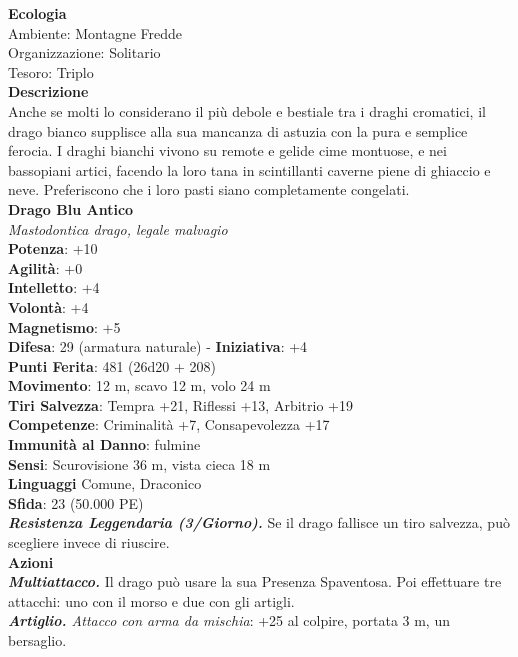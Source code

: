 \begin{multicols}{2}
\textbf{Ecologia}\\
Ambiente: Montagne Fredde\\
Organizzazione: Solitario\\
Tesoro: Triplo\\
\textbf{Descrizione}\\
Anche se molti lo considerano il più debole e bestiale tra i draghi cromatici, il drago bianco supplisce alla sua mancanza di astuzia con la pura e semplice ferocia. I draghi bianchi vivono su remote e gelide cime montuose, e nei bassopiani artici, facendo la loro tana in scintillanti caverne piene di ghiaccio e neve. Preferiscono che i loro pasti siano completamente congelati.\\


\medskip\textbf{Drago Blu Antico}\\
\emph{Mastodontica drago, legale malvagio}\\
\textbf{Potenza}: +10\\
\textbf{Agilità}: +0\\
\textbf{Intelletto}: +4\\
\textbf{Volontà}: +4\\
\textbf{Magnetismo}: +5\\	
\textbf{Difesa}: 29 (armatura naturale) - \textbf{Iniziativa}: +4\\
\textbf{Punti Ferita}: 481 (26d20 + 208)\\
\textbf{Movimento}: 12 m, scavo 12 m, volo 24 m\\
\textbf{Tiri Salvezza}: Tempra +21, Riflessi +13, Arbitrio +19\\
\textbf{Competenze}: Criminalità +7, Consapevolezza +17\\
\textbf{Immunità al Danno}: fulmine\\
\textbf{Sensi}: Scurovisione 36 m, vista cieca 18 m\\
\textbf{Linguaggi} Comune, Draconico\\
\textbf{Sfida}: 23 (50.000 PE)\smallskip\\
\emph{\textbf{Resistenza Leggendaria (3/Giorno).}} Se il drago fallisce un tiro salvezza, può scegliere invece di riuscire. \\
\smallskip\textbf{Azioni}\\
\emph{\textbf{Multiattacco.}} Il drago può usare la sua Presenza Spaventosa. Poi effettuare tre attacchi: uno con il morso e due con gli artigli.\\
\emph{\textbf{Artiglio.} Attacco con arma da mischia}: +25 al colpire, portata 3 m, un bersaglio.\\

\end{multicols}
